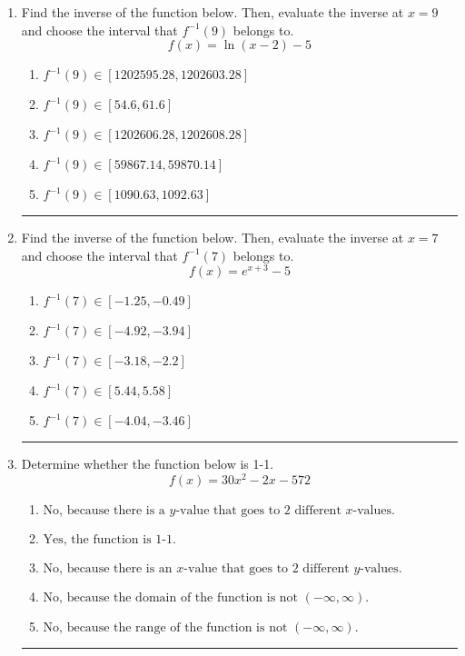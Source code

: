 \documentclass[14pt]{extbook}
\newcommand{\litem}[1]{\item#1\hspace*{-1cm}\rule{\textwidth}{0.4pt}}
\begin{document}
\begin{enumerate}
{\begin{enumerate}[label=\Alph*.]
\end{enumerate} }
\litem{
Find the inverse of the function below. Then, evaluate the inverse at $x = 9$ and choose the interval that $f^{-1}(9)$ belongs to.\[ f(x) = \ln{(x-2)}-5 \]\begin{enumerate}[label=\Alph*.]
\item \( f^{-1}(9) \in [1202595.28, 1202603.28] \)
\item \( f^{-1}(9) \in [54.6, 61.6] \)
\item \( f^{-1}(9) \in [1202606.28, 1202608.28] \)
\item \( f^{-1}(9) \in [59867.14, 59870.14] \)
\item \( f^{-1}(9) \in [1090.63, 1092.63] \)

\end{enumerate} }
\litem{
Find the inverse of the function below. Then, evaluate the inverse at $x = 7$ and choose the interval that $f^{-1}(7)$ belongs to.\[ f(x) = e^{x+3}-5 \]\begin{enumerate}[label=\Alph*.]
\item \( f^{-1}(7) \in [-1.25, -0.49] \)
\item \( f^{-1}(7) \in [-4.92, -3.94] \)
\item \( f^{-1}(7) \in [-3.18, -2.2] \)
\item \( f^{-1}(7) \in [5.44, 5.58] \)
\item \( f^{-1}(7) \in [-4.04, -3.46] \)

\end{enumerate} }
\litem{
Determine whether the function below is 1-1.\[ f(x) = 30 x^2 - 2 x - 572 \]\begin{enumerate}[label=\Alph*.]
\item \( \text{No, because there is a $y$-value that goes to 2 different $x$-values.} \)
\item \( \text{Yes, the function is 1-1.} \)
\item \( \text{No, because there is an $x$-value that goes to 2 different $y$-values.} \)
\item \( \text{No, because the domain of the function is not $(-\infty, \infty)$.} \)
\item \( \text{No, because the range of the function is not $(-\infty, \infty)$.} \)


\end{enumerate}}
\end{enumerate}
\end{document}
